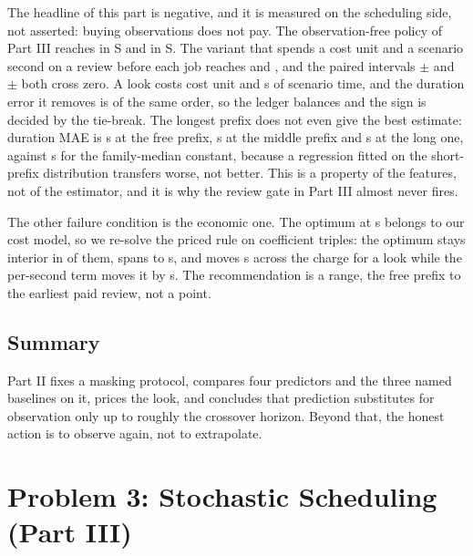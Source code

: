 \documentclass{swmcmthesis}
\begin{document}
The headline of this part is negative, and it is measured on the scheduling side, not
asserted: buying observations does not pay. The observation-free policy of Part III reaches
\slotPStochSTwoSlackOldETA{} in S\slotCaseTwo{} and \slotPStochSThreeSlackOldETA{} in
S\slotCaseThree{}. The variant that spends a cost unit and a scenario second on a review
before each job reaches \slotPStochSTwoRiskFusionETA{} and \slotPStochSThreeRiskFusionETA{},
and the paired intervals \slotPStochPairSTwoRiskFusionDiff{}$\pm$\slotPStochPairSTwoRiskFusionCI{}
and \slotPStochPairSThreeRiskFusionDiff{}$\pm$\slotPStochPairSThreeRiskFusionCI{} both cross
zero. A look costs \slotReviewCost{} cost unit and \slotReviewDelay{} s of scenario time, and
the duration error it removes is of the same order, so the ledger balances and the sign is
decided by the tie-break. The longest prefix does not even give the best estimate: duration
MAE is \slotPDurFreeMAE{} s at the free prefix, \slotPDurMidMAE{} s at the middle prefix and
\slotPDurLongMAE{} s at the long one, against \slotPDurFreeBaseMAE{} s for the family-median
constant, because a regression fitted on the short-prefix distribution transfers worse, not
better. This is a property of the features, not of the estimator, and it is why the review
gate in Part III almost never fires.

The other failure condition is the economic one. The optimum at \slotPEconOptT{} s
belongs to our cost model, so we re-solve the priced rule on \slotPEconNCell{}
coefficient triples: the optimum stays interior in \slotPEconInterior{} of them, spans
\slotPEconTMin{} to \slotPEconTMax{} s, and moves \slotPEconCZeroSpan{} s across the charge
for a look while the per-second term moves it by \slotPEconCOneSpan{} s. The
recommendation is a range, the free prefix to the earliest paid review, not a point.

\subsection{Summary}

Part II fixes a masking protocol, compares four predictors and the three named
baselines on it, prices the look, and concludes that prediction substitutes for
observation only up to roughly the crossover horizon. Beyond that, the honest
action is to observe again, not to extrapolate.

\section{Problem 3: Stochastic Scheduling (Part III)}
\label{sec:partthree}
\end{document}
